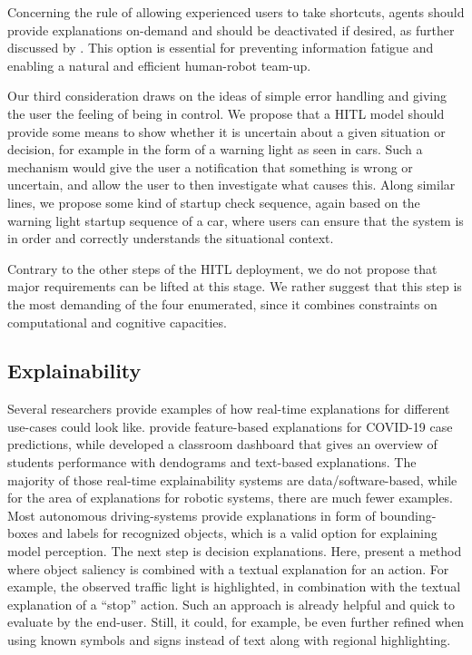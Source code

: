 \documentclass[twoside,11pt]{article}
\begin{document}
Concerning the rule of allowing experienced users to take shortcuts, agents should provide explanations on-demand and should be deactivated if desired, as further discussed by \cite{AndersonBischof:2013:PerformanceGestureGuides}. This option is essential for preventing information fatigue and enabling a natural and efficient human-robot team-up. 

Our third consideration draws on the ideas of simple error handling and giving the user the feeling of being in control. We propose that a HITL model should provide some means to show whether it is uncertain about a given situation or decision, for example in the form of a warning light as seen in cars. Such a mechanism would give the user a notification that something is wrong or uncertain, and allow the user to then investigate what causes this.  Along similar lines, we propose some kind of startup check sequence, again based on the warning light startup sequence of a car, where users can ensure that the system is in order and correctly understands the situational context.

Contrary to the other steps of the HITL deployment, we do not propose that major requirements can be lifted at this stage. We rather suggest that this step is the most demanding of the four enumerated, since it combines constraints on computational and cognitive capacities.

\subsection{Explainability}

Several researchers provide examples of how real-time explanations for different use-cases could look like. \citet{RodriguezEtAl:2021:DeepCovidxAI} provide feature-based explanations for COVID-19 case predictions, while \citet{Kulkarni:2021:EducationAIDashboard} developed a classroom dashboard that gives an overview of students performance with dendograms and text-based explanations. The majority of those real-time explainability systems are data/software-based, while for the area of explanations for robotic systems, there are much fewer examples.
Most autonomous driving-systems provide explanations in form of bounding-boxes and labels for recognized objects, which is a valid option for explaining model perception. 
The next step is decision explanations. Here, \citet{Ben-YounesEtAl:2022:DrivingBehaviorEx} present a method where object saliency is combined with a textual explanation for an action. For example, the observed traffic light is highlighted, in combination with the textual explanation of a ``stop'' action. Such an approach is already helpful and quick to evaluate by the end-user. Still, it could, for example, be even further refined when using known symbols and signs instead of text along with regional highlighting.
\end{document}
